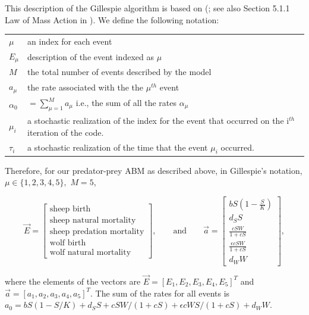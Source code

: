 \documentclass[11pt, oneside]{article}   	%
\begin{document}
This description of the Gillespie algorithm is based on (\citealt{Gillespie}; see also Section 5.1.1 Law of Mass Action in \citealt{Muller}). We define the following notation:

\begin{table}[htp]
\begin{center}
\begin{tabular}{ll}
$\mu$ & an index for each event \\
$E_\mu$ & description of the event indexed as $\mu$ \\
$M$ & the total number of events described by the model\\
$a_\mu$ & the rate associated with the the $\mu^{th}$ event\\
$\alpha_0$ & $= \sum_{\mu=1}^M a_\mu$ i.e., the sum of all the rates $\alpha_\mu$ \\
$\mu_i$ & a stochastic realization of the index for the event that occurred on the i$^{th}$ iteration of the code. \\
$\tau_i$ & a stochastic realization of the time that the event $\mu_i$ occurred.\\
\end{tabular}
\end{center}
\label{default}
\end{table}%

Therefore, for our predator-prey ABM as described above, in Gillespie's notation, $\mu \in \{1,2,3,4,5\},$ $M=5$,

\[\vec{E} = \left[\begin{array}{c} \mbox{sheep birth} \\ \mbox{sheep natural mortality} \\ \mbox{sheep predation mortality} \\ \mbox{wolf birth} \\ \mbox{wolf natural mortality} \end{array} \right], \qquad \mbox{and} \qquad \vec{a} = \left[\begin{array}{c} b S\left(1-\frac{S}{K}\right) \\ d_S S \\ \frac{c SW}{1+cS} \\ 
 \frac{\epsilon c SW}{1+cS} \\ d_W W \end{array} \right], \] 

where the elements of the vectors are $\vec{E} = [E_1, E_2, E_3, E_4, E_5]^T$ and $\vec{a} = [a_1, a_2, a_3, a_4, a_5]^T$. The sum of the rates for all events is $a_0 = bS(1-S/K) + d_SS + cSW/(1+cS) + \epsilon cWS/(1+cS) + d_W W$.
\end{document}
